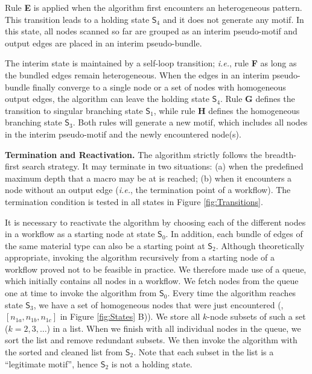 Rule \textbf{E} is applied when the algorithm first encounters an heterogeneous pattern.
This transition leads to a holding state $\mathsf{S}_4$ and it does not generate any motif.
In this state, all nodes scanned so far are grouped as an interim pseudo-motif and output edges are placed in an interim pseudo-bundle.

The interim state is maintained by a self-loop transition; \emph{i.e.}, rule \textbf{F} as long as the bundled edges remain heterogeneous.
When the edges in an interim pseudo-bundle finally converge to a single node or a set of nodes with homogeneous output edges, the algorithm can leave the holding state $\mathsf{S}_4$.
Rule \textbf{G} defines the transition to singular branching state $\mathsf{S}_1$, while rule \textbf{H} defines the homogeneous branching state $\mathsf{S}_3$.
Both rules will generate a new motif, which includes all nodes in the interim pseudo-motif and the newly encountered node(s).

\noindent \textbf{Termination and Reactivation.}
%
The algorithm strictly follows the breadth-first search strategy.
It may terminate in two situations:
(a) when the predefined maximum depth that a macro may be at is reached;
(b) when it encounters a node without an output edge (\emph{i.e.}, the termination point of a workflow).
The termination condition is tested in all states in Figure \ref{fig:Transitions}.

It is necessary to reactivate the algorithm by choosing each of the different nodes in a workflow as a starting node at state $\textsf{S}_0$.
In addition, each bundle of edges of the same material type can also be a starting point at $\textsf{S}_2$.
Although theoretically appropriate, invoking the algorithm recursively from a starting node of a workflow proved not to be feasible in practice.
We therefore made use of a queue, which initially contains all nodes in a workflow.
We fetch nodes from the queue one at time to invoke the algorithm from $\textsf{S}_0$.
Every time the algorithm reaches state $\textsf{S}_3$, we have a set of homogeneous nodes that were just encountered (\eg, $[n_{1a}, n_{1b}, n_{1c}]$ in Figure \ref{fig:States} B)).
We store all $k$-node subsets of such a set ($k = 2, 3, \ldots$) in a list.
When we finish with all individual nodes in the queue, we sort the list and remove redundant subsets.
We then invoke the algorithm with the sorted and cleaned list from $\textsf{S}_2$.
Note that each subset in the list is a ``legitimate motif'', hence $\textsf{S}_2$ is not a holding state.


